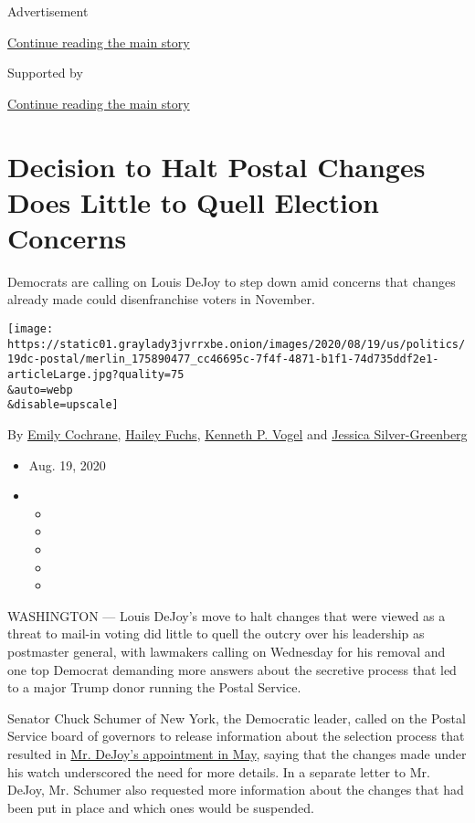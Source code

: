 Advertisement

\protect\hyperlink{after-top}{Continue reading the main story}

Supported by

\protect\hyperlink{after-sponsor}{Continue reading the main story}

\hypertarget{decision-to-halt-postal-changes-does-little-to-quell-election-concerns}{%
\section{Decision to Halt Postal Changes Does Little to Quell Election
Concerns}\label{decision-to-halt-postal-changes-does-little-to-quell-election-concerns}}

Democrats are calling on Louis DeJoy to step down amid concerns that
changes already made could disenfranchise voters in November.

\texttt{[image: https://static01.graylady3jvrrxbe.onion/images/2020/08/19/us/politics/19dc-postal/merlin\_175890477\_cc46695c-7f4f-4871-b1f1-74d735ddf2e1-articleLarge.jpg?quality=75\\\&auto=webp\\\&disable=upscale]}

By \href{https://www.nytimes3xbfgragh.onion/by/emily-cochrane}{Emily
Cochrane},
\href{https://www.nytimes3xbfgragh.onion/by/hailey-fuchs}{Hailey Fuchs},
\href{https://www.nytimes3xbfgragh.onion/by/kenneth-p-vogel}{Kenneth P.
Vogel} and
\href{https://www.nytimes3xbfgragh.onion/by/jessica-silver-greenberg}{Jessica
Silver-Greenberg}

\begin{itemize}
\item
  Aug. 19, 2020
\item
  \begin{itemize}
  \item
  \item
  \item
  \item
  \item
  \end{itemize}
\end{itemize}

WASHINGTON --- Louis DeJoy's move to halt changes that were viewed as a
threat to mail-in voting did little to quell the outcry over his
leadership as postmaster general, with lawmakers calling on Wednesday
for his removal and one top Democrat demanding more answers about the
secretive process that led to a major Trump donor running the Postal
Service.

Senator Chuck Schumer of New York, the Democratic leader, called on the
Postal Service board of governors to release information about the
selection process that resulted in
\href{https://www.nytimes3xbfgragh.onion/2020/05/07/us/politics/postmaster-general-louis-dejoy.html}{Mr.
DeJoy's appointment in May}, saying that the changes made under his
watch underscored the need for more details. In a separate letter to Mr.
DeJoy, Mr. Schumer also requested more information about the changes
that had been put in place and which ones would be suspended.


